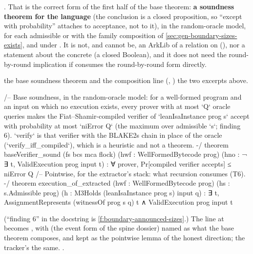 . That is the correct form of the first half of the base theorem:
\textbf{a soundness theorem for the language
} (the conclusion is a closed
proposition, so \enquote{except with probability} attaches to acceptance, not to it), in the
random-oracle model, for each admissible  or with the family composition of
\cref{sec:gen-boundary-sizes-exists}, and under . It is not, and cannot
be, an ArkLib  of a relation on 
(), nor a statement about the concrete  (a
closed Boolean), and it does not need the round-by-round implication if 
consumes the round-by-round form directly.

\begin{change}{the base soundness theorem and the composition line (, )}
\asis the two excerpts above.
\asproposed
\begin{leancode}
/-- Base soundness, in the random-oracle model: for a well-formed program and an input on
which no execution exists, every prover with at most `Q` oracle queries makes the
Fiat–Shamir-compiled verifier of `leanIsaInstance prog s` accept with probability at most
`niError Q` (the maximum over admissible `s`; finding 6). `verify` is that verifier with the
BLAKE2s chain in place of the oracle (`verify_iff_compiled`), which is a heuristic and not a
theorem. -/
theorem baseVerifier_sound (fs bcs mca flock) (hwf : WellFormedBytecode prog)
    (hno : ¬ ∃ t, ValidExecution prog input t) : ∀ prover, Pr[compiled verifier accepts] ≤ niError Q
/-- Pointwise, for the extractor's stack: what recursion consumes (T6). -/
theorem execution_of_extracted (hwf : WellFormedBytecode prog) (hs : s.Admissible prog)
    (h : M3Holds (leanIsaInstance prog s) input q) :
    ∃ t, AssignmentRepresents (witnessOf prog s q) t ∧ ValidExecution prog input t
\end{leancode}
(\enquote{finding 6} in the docstring is \cref{f:boundary-announced-sizes}.) The line at
 becomes
,
with  (the event form of the spine dossier) named as what the
base theorem composes, and  kept as the pointwise lemma of the honest
direction; the tracker's  the same.
\reason {}.
\end{change}
